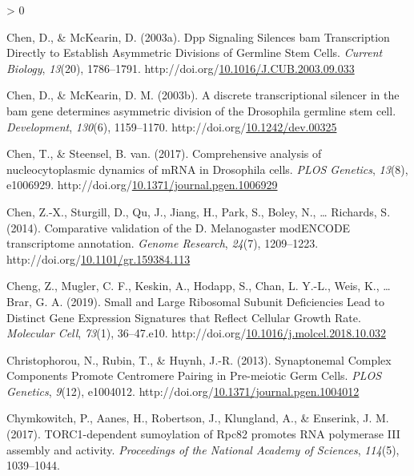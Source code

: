 \documentclass[12pt,oneside]{reedthesis}
\newlength{\cslhangindent}
\newenvironment{CSLReferences}[2] %
 {%
  \setlength{\parindent}{0pt}
  \ifodd #1 \everypar{\setlength{\hangindent}{\cslhangindent}}\ignorespaces\fi
  \ifnum #2 > 0
  \setlength{\parskip}{#2\baselineskip}
  \fi
 }%
 {}
\begin{document}
\begin{CSLReferences}{1}{0}
\leavevmode\hypertarget{ref-Chen2003o}{}%
Chen, D., \& McKearin, D. (2003a). Dpp {Signaling Silences} bam {Transcription Directly} to {Establish Asymmetric Divisions} of {Germline Stem Cells}. \emph{Current Biology}, \emph{13}(20), 1786--1791. http://doi.org/\href{https://doi.org/10.1016/J.CUB.2003.09.033}{10.1016/J.CUB.2003.09.033}

\leavevmode\hypertarget{ref-Chen2003q}{}%
Chen, D., \& McKearin, D. M. (2003b). A discrete transcriptional silencer in the bam gene determines asymmetric division of the {Drosophila} germline stem cell. \emph{Development}, \emph{130}(6), 1159--1170. http://doi.org/\href{https://doi.org/10.1242/dev.00325}{10.1242/dev.00325}

\leavevmode\hypertarget{ref-chenComprehensiveAnalysisNucleocytoplasmic2017}{}%
Chen, T., \& Steensel, B. van. (2017). Comprehensive analysis of nucleocytoplasmic dynamics of {mRNA} in {Drosophila} cells. \emph{PLOS Genetics}, \emph{13}(8), e1006929. http://doi.org/\href{https://doi.org/10.1371/journal.pgen.1006929}{10.1371/journal.pgen.1006929}

\leavevmode\hypertarget{ref-chenComparativeValidationMelanogaster2014}{}%
Chen, Z.-X., Sturgill, D., Qu, J., Jiang, H., Park, S., Boley, N., \ldots{} Richards, S. (2014). Comparative validation of the {D}. Melanogaster {modENCODE} transcriptome annotation. \emph{Genome Research}, \emph{24}(7), 1209--1223. http://doi.org/\href{https://doi.org/10.1101/gr.159384.113}{10.1101/gr.159384.113}

\leavevmode\hypertarget{ref-chengSmallLargeRibosomal2019}{}%
Cheng, Z., Mugler, C. F., Keskin, A., Hodapp, S., Chan, L. Y.-L., Weis, K., \ldots{} Brar, G. A. (2019). Small and {Large Ribosomal Subunit Deficiencies Lead} to {Distinct Gene Expression Signatures} that {Reflect Cellular Growth Rate}. \emph{Molecular Cell}, \emph{73}(1), 36--47.e10. http://doi.org/\href{https://doi.org/10.1016/j.molcel.2018.10.032}{10.1016/j.molcel.2018.10.032}

\leavevmode\hypertarget{ref-christophorouSynaptonemalComplexComponents2013}{}%
Christophorou, N., Rubin, T., \& Huynh, J.-R. (2013). Synaptonemal {Complex Components Promote Centromere Pairing} in {Pre-meiotic Germ Cells}. \emph{PLOS Genetics}, \emph{9}(12), e1004012. http://doi.org/\href{https://doi.org/10.1371/journal.pgen.1004012}{10.1371/journal.pgen.1004012}

\leavevmode\hypertarget{ref-Chymkowitch2017a}{}%
Chymkowitch, P., Aanes, H., Robertson, J., Klungland, A., \& Enserink, J. M. (2017). {TORC1-dependent} sumoylation of {Rpc82} promotes {RNA} polymerase {III} assembly and activity. \emph{Proceedings of the National Academy of Sciences}, \emph{114}(5), 1039--1044.


\end{CSLReferences}
\end{document}
